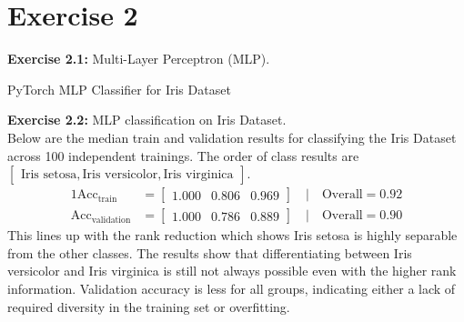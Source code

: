 \documentclass[11pt,a4paper]{article}
\begin{document}
\section{Exercise 2}
\noindent\textbf{Exercise 2.1:} Multi-Layer Perceptron (MLP).\\
\begin{listing}[H]
    \caption{PyTorch MLP Classifier for Iris Dataset}
    \label{lst:mlp}
    \end{listing}
\noindent\textbf{Exercise 2.2:} MLP classification on Iris Dataset.\\
\noindent Below are the median train and validation results for classifying the Iris Dataset across 100 independent trainings. The order of class results are $\begin{bmatrix}\text{Iris setosa}, \text{Iris versicolor}, \text{Iris virginica}\end{bmatrix}$.
\begin{alignat*}{1}
\text{Acc}_\text{train} &= \begin{bmatrix}1.000 & 0.806 & 0.969\end{bmatrix}\quad |\quad \text{Overall} = 0.92\\
\text{Acc}_\text{validation} &= \begin{bmatrix}1.000 & 0.786 & 0.889\end{bmatrix}\quad |\quad \text{Overall} = 0.90
\end{alignat*}
This lines up with the rank reduction which shows Iris setosa is highly separable from the other classes. The results show that differentiating between Iris versicolor and Iris virginica is still not always possible even with the higher rank information. Validation accuracy is less for all groups, indicating either a lack of required diversity in the training set or overfitting.
\end{document}
